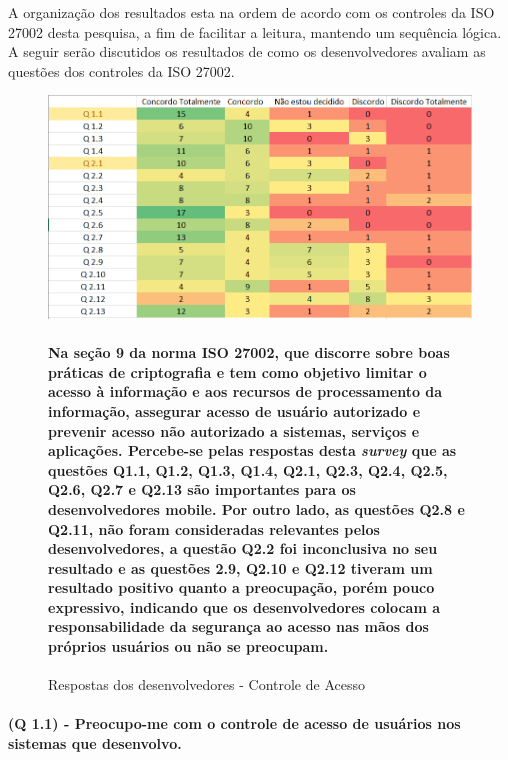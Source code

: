A organização dos resultados esta na ordem de acordo com os controles da ISO 27002 desta pesquisa, a fim de facilitar a leitura, mantendo um sequência lógica. A seguir serão discutidos os resultados de como os desenvolvedores avaliam as questões dos controles da ISO 27002. 

\begin{figure}[H]
\includegraphics[scale=0.7]{fig/Mapa de calor 1.PNG}
\caption{Respostas dos desenvolvedores - Controle de Acesso}
\label{fig:1}
\paragraph{ Na seção 9 da norma ISO 27002, que discorre sobre boas práticas de criptografia e tem como objetivo limitar o acesso à informação e aos recursos de processamento da informação, assegurar acesso de usuário autorizado e prevenir acesso não autorizado a sistemas, serviços e aplicações.  Percebe-se pelas respostas desta \textit{survey} que as questões Q1.1, Q1.2, Q1.3, Q1.4, Q2.1, Q2.3, Q2.4, Q2.5, Q2.6, Q2.7 e Q2.13 são importantes para os desenvolvedores mobile. Por outro lado, as questões Q2.8 e Q2.11, não foram consideradas relevantes pelos desenvolvedores, a questão Q2.2 foi inconclusiva no seu resultado e as questões 2.9, Q2.10 e Q2.12 tiveram um resultado positivo quanto a preocupação, porém pouco expressivo, indicando que os desenvolvedores colocam a responsabilidade da segurança ao acesso nas mãos dos próprios usuários ou não se preocupam.}

\end{figure}

\paragraph{\textbf{(Q 1.1)} - Preocupo-me com o controle de acesso de usuários nos sistemas que desenvolvo.}


